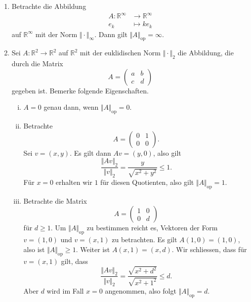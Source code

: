 \documentclass[../main.tex]{subfiles}
\begin{document}
\begin{examples}
  \leavevmode
  \begin{enumerate}[(1)]
    \item Betrachte die Abbildung
      \begin{align*}
        A \colon \mathbb{R}^{\infty} & \to \mathbb{R}^{\infty} \\
        e_k & \mapsto ke_k
      \end{align*}
      auf $\mathbb{R}^{\infty}$ mit der Norm $\Vert \cdot \Vert_{\infty}$.
      Dann gilt $\Vert A \Vert_{\text{op}} = \infty$.
    \item Sei $A \colon \mathbb{R}^2 \to \mathbb{R}^2$
      auf $\mathbb{R}^{2}$ mit der euklidischen Norm
      $\Vert \cdot \Vert_2$ die Abbildung, die durch
      die Matrix
      \[
        A =
        \begin{pmatrix}
          a & b \\ c & d
        \end{pmatrix}
      \]
      gegeben ist.
      Bemerke folgende Eigenschaften.
      \begin{enumerate}[(i)]
        \item $A = 0$ genau dann, wenn $\Vert A \Vert_\text{op} = 0$.
        \item Betrachte
          \[
            A =
            \begin{pmatrix}
              0 & 1 \\ 0 & 0
            \end{pmatrix}.
          \]
          Sei $v = (x, y)$.
          Es gilt dann $Av = (y, 0)$, also gilt
          \[
            \frac{\Vert Av \Vert_2}{\Vert v \Vert_2} = \frac{y}{\sqrt{x^2 + y^2} } \leq 1.
          \]
          Für $x = 0$ erhalten wir $1$ für diesen Quotienten,
          also gilt $\Vert A \Vert_{\text{op}} = 1$.
        \item Betrachte die Matrix
          \[
            A =
            \begin{pmatrix}
              1 & 0 \\ 0 & d
            \end{pmatrix}
          \]
          für $d \geq 1$.
          Um $\Vert A \Vert_{\text{op}}$ zu bestimmen
          reicht es, Vektoren der Form $v = (1, 0)$
          und $v = (x, 1)$ zu betrachten.
          Es gilt $A(1, 0) = (1, 0)$,
          also ist $\Vert A \Vert_{\text{op}} \geq 1$.
          Weiter ist
          $A(x, 1) = (x, d)$.
          Wir schliessen, dass für $v = (x, 1)$ gilt, dass
          \[
            \frac{\Vert Av \Vert_2}{\Vert v \Vert_2}
            = \frac{\sqrt{x^2 + d^2}}{\sqrt{x^2 + 1^2}} \leq d.
          \]
          Aber $d$ wird im Fall $x = 0$ angenommen,
          also folgt $\Vert A \Vert_{\text{op}} = d$.
      \end{enumerate}
  \end{enumerate}
\end{examples}
\end{document}
